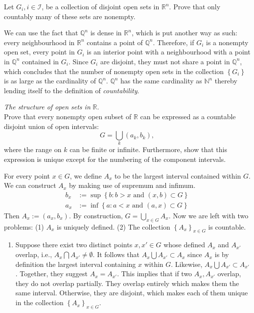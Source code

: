 \documentclass[answers]{exam}
\begin{document}
\begin{questions}
\begin{solution}
   \end{solution}
   \question
   Let $G_{i}, i \in \mathcal{I}$, be a collection of disjoint open sets in $\mathbb{R}^{n}$. Prove that only countably many of these sets are nonempty.
   \begin{solution}
      We can use the fact that $\mathbb{Q}^{n}$ is dense in $\mathbb{R}^{n}$, which is put another way as such: every neighbourhood in $\mathbb{R}^{n}$ contains a point of $\mathbb{Q}^{n}$. Therefore, if $G_{i}$ is a nonempty open set, every point in $G_{i}$ is an interior point with a neighbourhood with a point in $\mathbb{Q}^{n}$ contained in $G_{i}$. Since $G_{i}$ are disjoint, they must not share a point in $\mathbb{Q}^{n}$, which concludes that the number of nonempty open sets in the collection $\left\{G_{i}\right\}$ is as large as the cardinality of $\mathbb{Q}^{n}$. $\mathbb{Q}^{n}$ has the same cardinality as $\mathbb{N}^{n}$ thereby lending itself to the definition of \emph{countability}. 
   \end{solution}
   \question
   \emph{The structure of open sets in} $\mathbb{R}$.\\
   Prove that every nonempty open subset of $\mathbb{R}$ can be expressed as a countable disjoint union of open intervals:
   $$
      G = \bigcup\limits_{k} \left(a_{k}, b_{k}\right),
   $$
   where the range on $k$ can be finite or infinite. Furthermore, show that this expression is unique except for the numbering of the component intervals.
   \begin{solution}
      For every point $x \in G$, we define $A_{x}$ to be the largest interval contained within $G$. We can construct $A_{x}$ by making use of supremum and infimum.
      \begin{align*}
         b_{x} &:= \sup\left\{b: b>x \text{ and } \left(x,b\right) \subset G \right\}\\
         a_{x} &:= \inf \left\{a: a < x \text{ and } \left(a, x\right) \subset G \right\}
      \end{align*}
      Then $A_{x} := \left(a_{x}, b_{x}\right)$. By construction, $G = \bigcup_{x\in G} A_{x}$. Now we are left with two problems: (1) $A_{x}$ is uniquely defined. (2) The collection $\left\{A_{x} \right\}_{x\in G}$ is countable.
      \begin{enumerate}
         \item Suppose there exist two distinct points $x,x' \in G$ whose defined $A_{x}$ and $A_{x'}$ overlap, i.e., $A_{x} \bigcap A_{x'} \neq \emptyset$. It follows that $A_{x} \bigcup A_{x'} \subset A_{x}$ since $A_{x}$ is by definition the largest interval containing $x$ within $G$. Likewise, $A_{x} \bigcup A_{x'} \subset A_{x'}$. Together, they suggest $A_{x} = A_{x'}$. This implies that if two $A_{x}, A_{x'}$ overlap, they do not overlap partially. They overlap entirely which makes them the same interval. Otherwise, they are disjoint, which makes each of them unique in the collection $\left\{A_{x} \right\}_{x\in G}$.

\end{enumerate}
\end{solution}
\end{questions}
\end{document}
